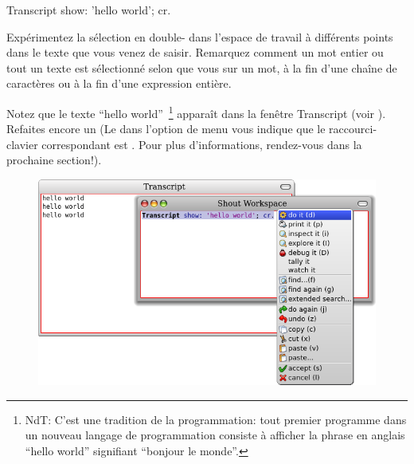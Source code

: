 \documentclass[a4paper,10pt,twoside]{book}
\begin{document}
\begin{code}{}
Transcript show: 'hello world'; cr.
\end{code}

Expérimentez la sélection en double-\clickant{} dans l'espace de travail 
à différents points dans le texte que vous venez de saisir.
Remarquez comment un mot entier ou tout un texte est sélectionné 
selon que vous \clickz{} sur un mot, à la fin d'une chaîne de
caractères ou à la fin d'une expression entière.


Notez que le texte ``hello world''~\footnote{NdT: C'est une tradition de la
programmation: tout premier programme dans un nouveau langage de
programmation consiste à afficher la phrase en anglais ``hello world''
signifiant ``bonjour le monde''.}
apparaît dans la fenêtre Transcript (voir ).
Refaites encore un 
(Le  dans l'option de menu  vous indique que
le raccourci-clavier correspondant est . Pour plus
d'informations, rendez-vous dans la prochaine section!).

\begin{figure}[htb]
\ifluluelse
	{\centerline {\includegraphics[width=\textwidth]{HelloWorld}}}
\caption{}
\end{figure}
\end{document}
